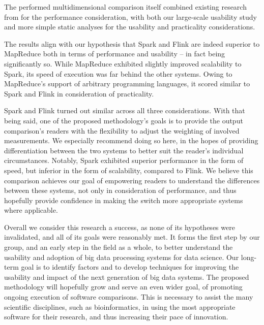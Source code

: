   The performed multidimensional comparison itself combined existing research from \citeauthor{VEIGA:EVALUATION:2015} \cite{VEIGA:EVALUATION:2015} for the performance consideration, with both our large-scale usability study and more simple static analyses for the usability and practicality considerations.
  
  The results align with our hypothesis that Spark and Flink are indeed superior to MapReduce both in terms of performance and usability -- in fact being significantly so. While MapReduce exhibited slightly improved scalability to Spark, its speed of execution was far behind the other systems. Owing to MapReduce's support of arbitrary programming languages, it scored similar to Spark and Flink in consideration of practicality.

  Spark and Flink turned out similar across all three considerations. With that being said, one of the proposed methodology's goals is to provide the output comparison's readers with the flexibility to adjust the weighting of involved measurements. We especially recommend doing so here, in the hopes of providing differentiation between the two systems to better suit the reader's individual circumstances. Notably, Spark exhibited superior performance in the form of speed, but inferior in the form of scalability, compared to Flink. We believe this comparison achieves our goal of empowering readers to understand the differences between these systems, not only in consideration of performance, and thus hopefully provide confidence in making the switch more appropriate systems where applicable. \medskip
  
  
  Overall we consider this research a success, as none of its hypotheses were invalidated, and all of its goals were reasonably met. It forms the first step by our group, and an early step in the field as a whole, to better understand the usability and adoption of big data processing systems for data science. Our long-term goal is to identify factors and to develop techniques for improving the usability and impact of the next generation of big data systems. The proposed methodology will hopefully grow and serve an even wider goal, of promoting ongoing execution of software comparisons. This is necessary to assist the many scientific disciplines, such as bioinformatics, in using the most appropriate software for their research, and thus increasing their pace of innovation.